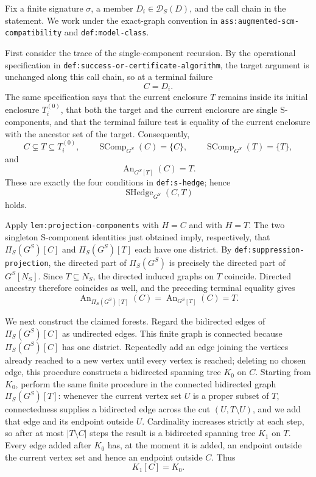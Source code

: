 Fix a finite signature \(\sigma\), a member \(D_i\in\mathcal D_S(D)\), and the call chain in the statement.  We work under the exact-graph convention in \texttt{ass:augmented-scm-compatibility} and \texttt{def:model-class}.

First consider the trace of the single-component recursion.  By the operational specification in \texttt{def:success-or-certificate-algorithm}, the target argument is unchanged along this call chain, so at a terminal failure
\[
 C=D_i.
\]
The same specification says that the current enclosure \(T\) remains inside its initial enclosure \(T_i^{(0)}\), that both the target and the current enclosure are single S-components, and that the terminal failure test is equality of the current enclosure with the ancestor set of the target.  Consequently,
\[
 C\subsetneq T\subseteq T_i^{(0)},\qquad
 \operatorname{SComp}_{G^S}(C)=\{C\},\qquad
 \operatorname{SComp}_{G^S}(T)=\{T\},
\]
and
\[
 \operatorname{An}_{G^S[T]}(C)=T.
\]
These are exactly the four conditions in \texttt{def:s-hedge}; hence
\[
 \operatorname{SHedge}_{G^S}(C,T)
\]
holds.

Apply \texttt{lem:projection-components} with \(H=C\) and with \(H=T\).  The two singleton S-component identities just obtained imply, respectively, that \(\Pi_S(G^S)[C]\) and \(\Pi_S(G^S)[T]\) each have one district.  By \texttt{def:suppression-projection}, the directed part of \(\Pi_S(G^S)\) is precisely the directed part of \(G^S[N_S]\).  Since \(T\subseteq N_S\), the directed induced graphs on \(T\) coincide.  Directed ancestry therefore coincides as well, and the preceding terminal equality gives
\[
 \operatorname{An}_{\Pi_S(G^S)[T]}(C)
 =\operatorname{An}_{G^S[T]}(C)
 =T.
\]

We next construct the claimed forests.  Regard the bidirected edges of \(\Pi_S(G^S)[C]\) as undirected edges.  This finite graph is connected because \(\Pi_S(G^S)[C]\) has one district.  Repeatedly add an edge joining the vertices already reached to a new vertex until every vertex is reached; deleting no chosen edge, this procedure constructs a bidirected spanning tree \(K_0\) on \(C\).  Starting from \(K_0\), perform the same finite procedure in the connected bidirected graph \(\Pi_S(G^S)[T]\): whenever the current vertex set \(U\) is a proper subset of \(T\), connectedness supplies a bidirected edge across the cut \((U,T\setminus U)\), and we add that edge and its endpoint outside \(U\).  Cardinality increases strictly at each step, so after at most \(|T\setminus C|\) steps the result is a bidirected spanning tree \(K_1\) on \(T\).  Every edge added after \(K_0\) has, at the moment it is added, an endpoint outside the current vertex set and hence an endpoint outside \(C\).  Thus
\[
 K_1[C]=K_0.
\]

